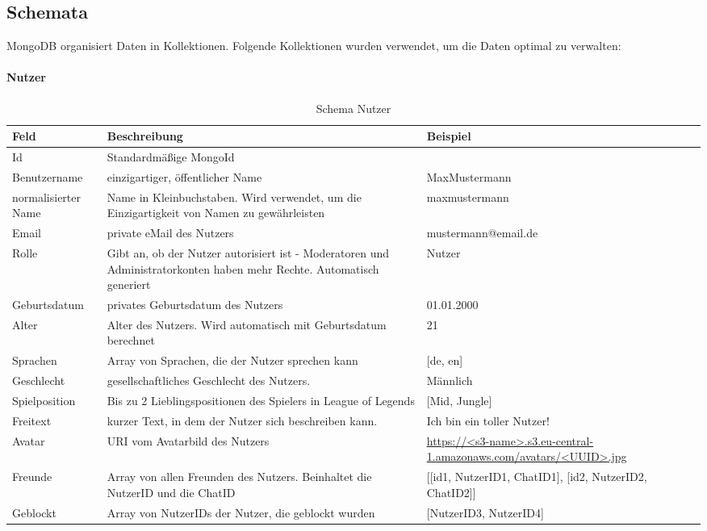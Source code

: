 \subsection{Schemata}
MongoDB organisiert Daten in Kollektionen.	
Folgende Kollektionen wurden verwendet, um die Daten optimal zu verwalten:

\paragraph{Nutzer}
\begin{table}
    \centering
    \begin{tabularx}{\textwidth}{ |X|X|X| } 
        \hline
        Feld & Beschreibung & Beispiel \\ 
        \hline
        Id & Standardmäßige MongoId & \\
        Benutzername & einzigartiger, öffentlicher Name & MaxMustermann \\ 
        normalisierter Name & Name in Kleinbuchstaben. Wird verwendet, um die Einzigartigkeit von Namen zu gewährleisten & maxmustermann \\ 
        Email & private eMail des Nutzers & mustermann@email.de \\
        Rolle & Gibt an, ob der Nutzer autorisiert ist - Moderatoren und Administratorkonten haben mehr Rechte. Automatisch generiert & Nutzer \\ 
        Geburtsdatum & privates Geburtsdatum des Nutzers & 01.01.2000 \\ 
        Alter & Alter des Nutzers. Wird automatisch mit Geburtsdatum berechnet & 21 \\ 
        Sprachen & Array von Sprachen, die der Nutzer sprechen kann & {[de, en]} \\
        Geschlecht & gesellschaftliches Geschlecht des Nutzers. & Männlich \\ 
        Spielposition & Bis zu 2 Lieblingspositionen des Spielers in League of Legends & {[Mid, Jungle]} \\ 
        Freitext & kurzer Text, in dem der Nutzer sich beschreiben kann. & Ich bin ein toller Nutzer! \\
        Avatar & URI vom Avatarbild des Nutzers & \url{https://<s3-name>.s3.eu-central-1.amazonaws.com/avatars/<UUID>.jpg} \\ 
        Freunde & Array von allen Freunden des Nutzers. Beinhaltet die NutzerID und die ChatID & {[[id1, NutzerID1, ChatID1], [id2, NutzerID2, ChatID2]]}\\ 
        Geblockt & Array von NutzerIDs der Nutzer, die geblockt wurden & {[NutzerID3, NutzerID4]} \\ 
        \hline
    \end{tabularx}
    \caption{Schema Nutzer}
    \label{db:table:nutzer}
\end{table}

